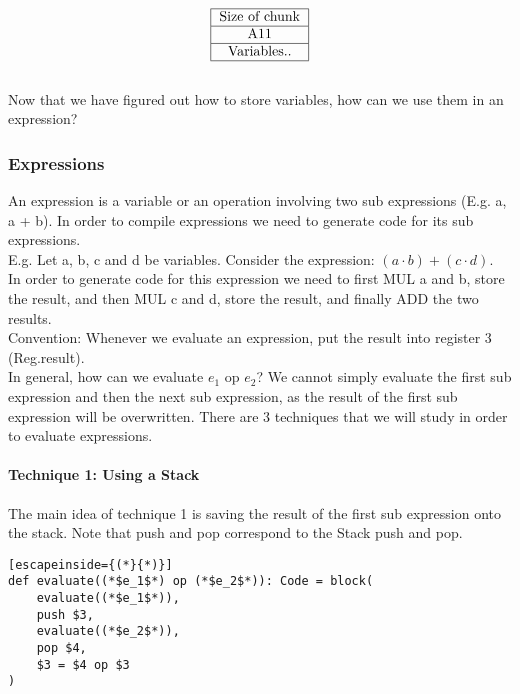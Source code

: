 \documentclass[12pt, letterpaper]{article}
\begin{document}
\[
\begin{tabular}{|c|}
\hline
Size of chunk\\
\hline
A11\\
\hline
Variables..\\
\hline
\end{tabular}
\]\\

Now that we have figured out how to store variables, how can we use them in an expression?

\subsubsection{Expressions}
An expression is a variable or an operation involving two sub expressions (E.g. a, a + b). In order to compile expressions we need to generate code for its sub expressions.\\

E.g. Let a, b, c and d be variables. Consider the expression: \((a \cdot b) + (c \cdot d)\).\\

In order to generate code for this expression we need to first MUL a and b, store the result, and then MUL c and d, store the result, and finally ADD the two results.\\

Convention: Whenever we evaluate an expression, put the result into register 3 (Reg.result).\\

In general, how can we evaluate \(e_1\) op \(e_2\)? We cannot simply evaluate the first sub expression and then the next sub expression, as the result of the first sub expression will be overwritten. There are 3 techniques that we will study in order to evaluate expressions.

\paragraph{Technique 1: Using a Stack} \hfill

The main idea of technique 1 is saving the result of the first sub expression onto the stack. Note that push and pop correspond to the Stack push and pop.

\begin{lstlisting}[escapeinside={(*}{*)}]
def evaluate((*$e_1$*) op (*$e_2$*)): Code = block(
	evaluate((*$e_1$*)),
	push $3,
	evaluate((*$e_2$*)),
	pop $4,
	$3 = $4 op $3
)
\end{lstlisting}
\end{document}
